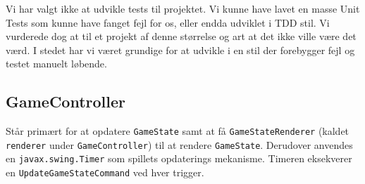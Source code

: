 \documentclass[titlepage,danish]{article}
\newcommand{\code}[1]{\texttt{#1}}
\begin{document}
Vi har valgt ikke at udvikle tests til projektet. Vi kunne have lavet en masse Unit Tests som kunne
have fanget fejl for os, eller endda udviklet i TDD stil. Vi vurderede dog at til et projekt af
denne størrelse og art at det ikke ville være det værd. I stedet har vi været grundige for at
udvikle i en stil der forebygger fejl og testet manuelt løbende.

\subsection{GameController}
Står primært for at opdatere \code{GameState} samt at få \code{GameStateRenderer} (kaldet \code{renderer}
under \code{GameController}) til at rendere \code{GameState}. Derudover anvendes en
\code{javax.swing.Timer} som spillets opdaterings mekanisme. Timeren eksekverer en
\code{UpdateGameStateCommand} ved hver trigger.
\end{document}
